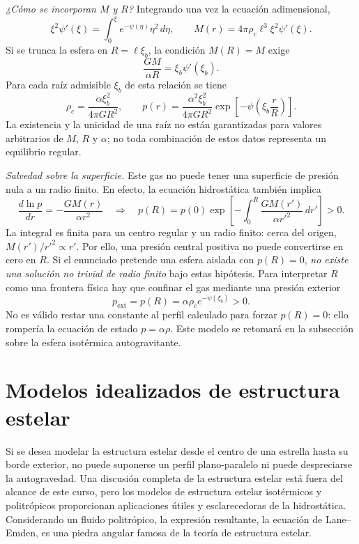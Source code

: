 \begin{enumerate}
\textit{¿Cómo se incorporan $M$ y $R$?} Integrando una vez la ecuación adimensional,
$$
\xi^2\psi'(\xi)=\int_0^\xi e^{-\psi(\eta)}\eta^2\,d\eta,
\qquad
M(r)=4\pi\rho_c\ell^3\xi^2\psi'(\xi).
$$
Si se trunca la esfera en $R=\ell\xi_b$, la condición $M(R)=M$ exige
$$
\boxed{\frac{GM}{\alpha R}=\xi_b\psi'(\xi_b)}.
$$
Para cada raíz admisible $\xi_b$ de esta relación se tiene
$$
\rho_c=\frac{\alpha\xi_b^2}{4\pi GR^2},
\qquad
\boxed{
p(r)=\frac{\alpha^2\xi_b^2}{4\pi GR^2}
\exp\!\left[-\psi\!\left(\xi_b\frac{r}{R}\right)\right]
}.
$$
La existencia y la unicidad de una raíz no están garantizadas para valores arbitrarios de $M$, $R$ y $\alpha$; no toda combinación de estos datos representa un equilibrio regular.

\textit{Salvedad sobre la superficie.} Este gas no puede tener una superficie de presión nula a un radio finito. En efecto, la ecuación hidrostática también implica
$$
\frac{d\ln p}{dr}=-\frac{GM(r)}{\alpha r^2}
\quad\Longrightarrow\quad
p(R)=p(0)\exp\!\left[-\int_0^R
\frac{GM(r')}{\alpha r'^2}\,dr'\right]>0.
$$
La integral es finita para un centro regular y un radio finito: cerca del origen, $M(r')/r'^2\propto r'$. Por ello, una presión central positiva no puede convertirse en cero en $R$. Si el enunciado pretende una esfera aislada con $p(R)=0$, \emph{no existe una solución no trivial de radio finito} bajo estas hipótesis. Para interpretar $R$ como una frontera física hay que confinar el gas mediante una presión exterior
$$
p_{\mathrm{ext}}=p(R)=\alpha\rho_c e^{-\psi(\xi_b)}>0.
$$
No es válido restar una constante al perfil calculado para forzar $p(R)=0$: ello rompería la ecuación de estado $p=\alpha\rho$. Este modelo se retomará en la subsección sobre la esfera isotérmica autogravitante.
\end{enumerate}

\section{Modelos idealizados de estructura estelar}

Si se desea modelar la estructura estelar desde el centro de una estrella hasta su borde exterior, no puede suponerse un perfil plano-paralelo ni puede despreciarse la autogravedad. Una discusión completa de la estructura estelar está fuera del alcance de este curso, pero los modelos de estructura estelar isotérmicos y politrópicos proporcionan aplicaciones útiles y esclarecedoras de la hidrostática. Considerando un fluido politrópico, la expresión resultante, la ecuación de Lane--Emden, es una piedra angular famosa de la teoría de estructura estelar.

